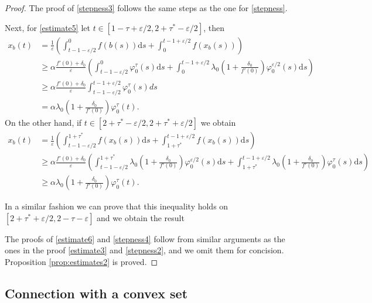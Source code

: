 \documentclass[a4paper,11pt]{article}
\theoremstyle{plain}
\theoremstyle{definition}
\theoremstyle{definition}
\newcommand{\dd}{\mathrm{d}}
\numberwithin{equation}{section}
\begin{document}
\begin{proof}
The proof of \eqref{stepness3} follows the same steps as the one for \eqref{stepness}.

Next, for \eqref{estimate5} let $t\in[1-\tau+\varepsilon/2,2+\tau^*-\varepsilon/2]$, then
\begin{align*}
    x_b(t) &= \frac{1}{\varepsilon}\left( \int_{t-1-\varepsilon/2}^{0} f(b(s))\dd s + \int_0^{t-1+\varepsilon/2} f(x_b(s))\right) \\
    &\geq \alpha\frac{f'(0)+\delta_0}{\varepsilon}\left( \int_{t-1-\varepsilon/2}^0 \varphi_0^{\tau}(s)\dd s + \int_0^{t-1+\varepsilon/2} \lambda_0\left( 1+\frac{\delta_0}{f'(0)} \right) \varphi_0^{\varepsilon/2}(s) \dd s \right) \\
    &\geq \alpha\frac{f'(0)+\delta_0}{\varepsilon} \int_{t-1-\varepsilon/2}^{t-1+\varepsilon/2} \varphi_0^\tau(s) ds \\
    &= \alpha\lambda_0\left( 1+\frac{\delta_0}{f'(0)} \right) \varphi_0^\tau(t).
\end{align*}
On the other hand, if $t\in[2+\tau^*-\varepsilon/2,2+\tau^*+\varepsilon/2]$ we obtain
\begin{align*}
    x_b(t) &= \frac{1}{\varepsilon}\left( \int_{t-1-\varepsilon/2}^{1+\tau^*} f(x_b(s))\dd s + \int_{1+\tau^*}^{t-1+\varepsilon/2} f(x_b(s))\dd s \right) \\
    &\geq \alpha \frac{f'(0)+\delta_0}{\varepsilon}\left( \int_{t-1-\varepsilon/2}^{1+\tau^*} \lambda_0 \left( 1+\frac{\delta_0}{f'(0)} \right) \varphi_0^{\varepsilon/2}(s)\dd s + \int_{1+\tau^*}^{t-1+\varepsilon/2} \lambda_0 \left( 1+\frac{\delta_0}{f'(0)} \right) \varphi_0^{\tau}(s)\dd s \right) \\
    &\geq \alpha\lambda_0 \left( 1+\frac{\delta_0}{f'(0)} \right) \varphi_0^{\tau}(t).
\end{align*}

In a similar fashion we can prove that this inequality holds on $[2+\tau^*+\varepsilon/2,2-\tau-\varepsilon]$ and we obtain the result

    The proofs of \eqref{estimate6} and \eqref{stepness4} follow from similar arguments as the ones in the proof \eqref{estimate3} and \eqref{stepness2}, and we omit them for concision. Proposition \ref{prop:estimates2} is proved.
\end{proof}

\subsection{Connection with a convex set}
\end{document}

